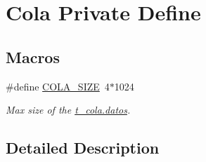 \hypertarget{group___cola___private___define}{}\section{Cola Private Define}
\label{group___cola___private___define}
\subsection*{Macros}
\begin{DoxyCompactItemize}
\item 
\#define \hyperlink{group___cola___private___define_gad5b7f14b39751409f4090d7c2d45f915}{C\+O\+L\+A\+\_\+\+S\+I\+ZE}~4$\ast$1024\hypertarget{group___cola___private___define_gad5b7f14b39751409f4090d7c2d45f915}{}\label{group___cola___private___define_gad5b7f14b39751409f4090d7c2d45f915}

\begin{DoxyCompactList}\small\item\em Max size of the \hyperlink{structt__cola_a61215b1ae633a2a4463e0abf0a796f41}{t\+\_\+cola.\+datos}. \end{DoxyCompactList}\end{DoxyCompactItemize}


\subsection{Detailed Description}
